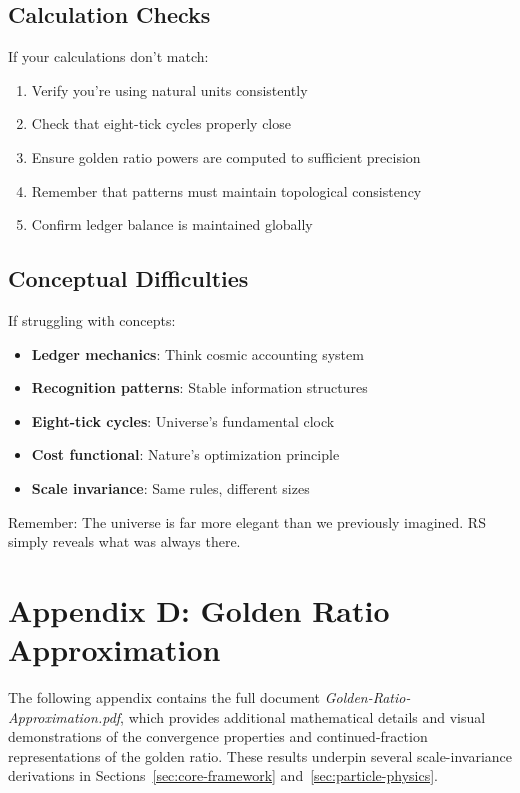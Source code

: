 \documentclass[12pt,a4paper]{article}
\theoremstyle{definition}
\begin{document}
\subsection{Calculation Checks}

If your calculations don't match:

\begin{enumerate}
    \item Verify you're using natural units consistently
    \item Check that eight-tick cycles properly close
    \item Ensure golden ratio powers are computed to sufficient precision
    \item Remember that patterns must maintain topological consistency
    \item Confirm ledger balance is maintained globally
\end{enumerate}

\subsection{Conceptual Difficulties}

If struggling with concepts:

\begin{itemize}
    \item \textbf{Ledger mechanics}: Think cosmic accounting system
    \item \textbf{Recognition patterns}: Stable information structures
    \item \textbf{Eight-tick cycles}: Universe's fundamental clock
    \item \textbf{Cost functional}: Nature's optimization principle
    \item \textbf{Scale invariance}: Same rules, different sizes
\end{itemize}

Remember: The universe is far more elegant than we previously imagined. RS simply reveals what was always there.

\section{Appendix D: Golden Ratio Approximation}

The following appendix contains the full document \textit{Golden-Ratio-Approximation.pdf}, which provides additional mathematical details and visual demonstrations of the convergence properties and continued-fraction representations of the golden ratio. These results underpin several scale-invariance derivations in Sections~\ref{sec:core-framework} and~\ref{sec:particle-physics}.


\end{document}
